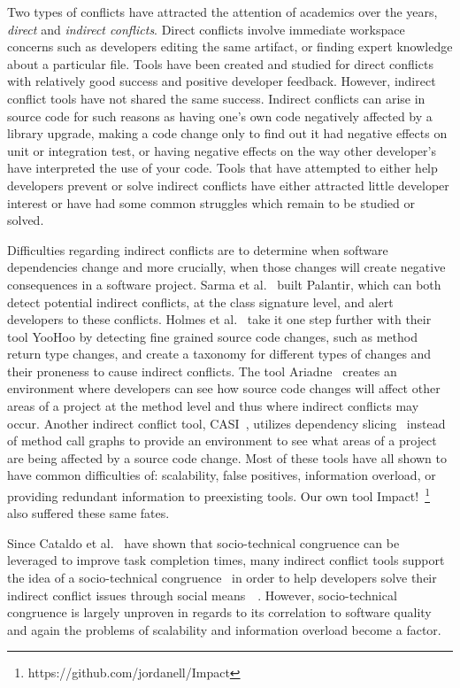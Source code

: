 \documentclass[conference]{IEEEtran}
\begin{document}
Two types of conflicts have attracted the attention of academics over the years, \textit{direct} and 
\textit{indirect conflicts}. Direct conflicts involve immediate workspace concerns such as developers editing the same
artifact, or finding expert knowledge about a particular file. Tools have been created and studied for direct conflicts
~\cite{Xiang:2008:ERT, Biehl:2007:FVD, Sarma:2009:TIV, Khurana:2009:PFC} with relatively good success and 
positive developer feedback. However, indirect conflict tools have not shared the same success. Indirect conflicts
can arise in source code for such reasons as having one's own code negatively affected by a library upgrade,
making a code change only to find out it had negative effects on unit or integration test, or having negative effects
on the way other developer's have interpreted the use of your code. Tools that have attempted to either
help developers prevent or solve indirect conflicts have either attracted little developer interest or have
had some common struggles which remain to be studied or solved.

Difficulties regarding indirect conflicts are to determine when software dependencies change and more crucially,
when those changes will create negative consequences in a software project.
Sarma et al.~\cite{Sarma:2007:TSA} built Palantir, which can both detect potential indirect conflicts, at the class signature level,
and alert developers to these conflicts. Holmes et al.~\cite{Holmes:2010:CAR} take it
one step further with their tool YooHoo by detecting fine grained source code changes, such as method return type changes, 
and create a taxonomy for different
types of changes and their proneness to cause indirect conflicts. The tool Ariadne~\cite{Trainer:2005:BGT} 
creates an environment where developers can see how source code changes will affect other areas of a project at the 
method level and thus where indirect conflicts may occur. 
Another indirect conflict tool, CASI~\cite{Servant:2010:CPI},
utilizes dependency slicing~\cite{Bajracharya:2009:SIS} instead of method call graphs to provide 
an environment to see what areas of a project are being affected by a source code change. 
Most of these tools have all shown to have common difficulties of: scalability, false positives, information overload, 
or providing redundant information to preexisting tools. 
Our own tool Impact!~\footnote{https://github.com/jordanell/Impact} also suffered these same fates.

Since Cataldo et al.~\cite{Cataldo:2006:ICR} have shown that socio-technical congruence can be leveraged to improve task completion
times, many indirect conflict tools support the idea of a socio-technical congruence~\cite{Kwan:2011:ESC} in order to help
developers solve their indirect conflict issues through social means~\cite{Begel:2010:CDE}~\cite{Borici:2012:CHA}. 
However, socio-technical congruence is largely unproven in regards to its correlation to
software quality~\cite{Kwan:2011:SCE} and again the problems of scalability and information overload become a factor.
\end{document}
